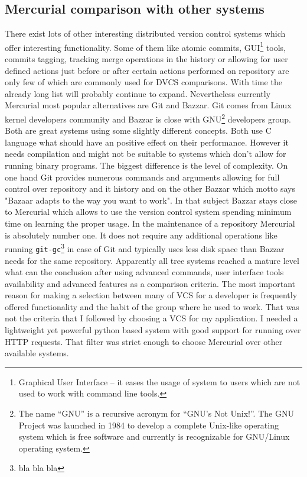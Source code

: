 \subsection{Mercurial comparison with other systems}\label{subsec:dvcs_compare}
There exist lots of other interesting distributed version control systems which offer interesting functionality. Some of them like atomic commits, GUI\footnote{Graphical User Interface -- it eases the usage of system to users which are not used to work with command line tools.} tools, commits tagging, tracking merge operations in the history or allowing for user defined actions just before or after certain actions performed on repository are only few of which are commonly used for DVCS comparisons\cite{wiki_dvcs_compare}. With time the already long list\cite{wiki_dvcs_list} will probably continue to expand. Nevertheless currently Mercurial most popular alternatives are Git and Bazzar. Git comes from Linux kernel developers community and Bazzar is close with GNU\footnote{The name “GNU” is a recursive acronym for “GNU's Not Unix!”. The GNU Project was launched in 1984 to develop a complete Unix-like operating system which is free software and currently is recognizable for GNU/Linux operating system.} developers group. Both are great systems using some slightly different concepts. Both use C language what should have an positive effect on their performance. However it needs compilation and might not be suitable to systems which don't allow for running binary programs. The biggest difference is the level of complexity. On one hand Git provides numerous commands and arguments allowing for full control over repository and it history and on the other Bazzar which motto says "Bazaar adapts to the way you want to work". In that subject Bazzar stays close to Mercurial which allows to use the version control system spending minimum time on learning the proper usage. In the maintenance of a repository Mercurial is absolutely number one. It does not require any additional operations like running \texttt{git-gc}\footnote{bla bla bla} in case of Git and typically uses less disk space than Bazzar needs for the same repository. Apparently all tree systems reached a mature level what can the conclusion after using advanced commands, user interface tools availability and  advanced features as a comparison criteria. The most important reason for making a selection between many of VCS for a developer is frequently offered functionality and the habit of the group where he used to work. That was not the criteria that I followed by choosing a VCS for my application. I needed a lightweight yet powerful python based system with good support for running over HTTP requests. That filter was strict enough to choose Mercurial over other available systems.     

